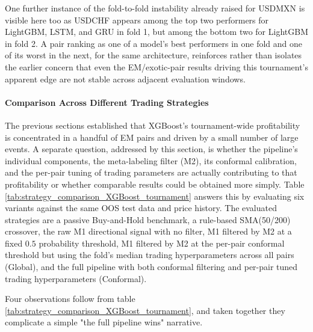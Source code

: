 \documentclass[12pt, a4paper]{article}
\begin{document}
\medskip

One further instance of the fold-to-fold instability already raised for USDMXN is visible here too as USDCHF appears among the top two performers for LightGBM, LSTM, and GRU in 
fold 1, but among the bottom two for LightGBM in fold 2. A pair ranking as one of a model's best performers in one fold and one of its worst in the next, for the same architecture, 
reinforces rather than isolates the earlier concern that even the EM/exotic-pair results driving this tournament's apparent edge are not stable across adjacent evaluation windows.


\paragraph{Comparison Across Different Trading Strategies}\hspace{0pt}

The previous sections established that XGBoost's tournament-wide profitability is concentrated in a handful of EM pairs and driven by a small number of large events. A separate 
question, addressed by this section, is whether the pipeline's individual components, the meta-labeling filter (M2), its conformal calibration, and the per-pair tuning of trading 
parameters are actually contributing to that profitability or whether comparable results could be obtained more simply. Table \ref{tab:strategy_comparison_XGBoost_tournament} 
answers this by evaluating six variants against the same OOS test data and price history. The evaluated strategies are a passive Buy-and-Hold benchmark, a rule-based SMA(50/200) 
crossover, the raw M1 directional signal with no filter, M1 filtered by M2 at a fixed $0.5$ probability threshold, M1 filtered by M2 at the per-pair conformal threshold but using 
the fold's median trading hyperparameters across all pairs (Global), and the full pipeline with both conformal filtering and per-pair tuned trading hyperparameters (Conformal).



Four observations follow from table \ref{tab:strategy_comparison_XGBoost_tournament}, and taken together they complicate a simple "the full pipeline wins" narrative.
\end{document}
